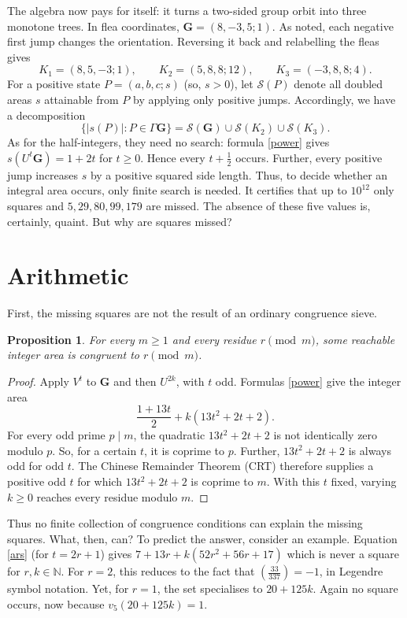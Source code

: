 \documentclass[12pt]{article}
\newtheorem{proposition}[theorem]{Proposition}
\theoremstyle{definition}
\theoremstyle{remark}
\newcommand{\mG}{\mathbf G}
\newcommand{\symb}[2]{\left(\frac{#1}{#2}\right)}
\begin{document}
The algebra now pays for itself: it turns a two-sided group orbit into three
monotone trees. In flea coordinates, $\mG=(8,-3,5;1)$. As noted, each negative first jump changes the orientation. Reversing it back and relabelling the fleas gives
\begin{equation*}
	K_1=(8,5,-3;1),\qquad K_2=(5,8,8;12),\qquad
	K_3=(-3,8,8;4).
\end{equation*}
For a positive state $P=(a,b,c;s)$ (so, $s>0$), let
$\mathscr S(P)$ denote all doubled areas $s$ attainable from $P$ by applying only positive jumps. Accordingly, we have a decomposition
\begin{equation*}
	\{|s(P)|:P\in\Gamma\mG\}
	=\mathscr S(\mG)\cup\mathscr S(K_2)\cup\mathscr S(K_3).
\end{equation*}
As for the half-integers, they need no search: formula \eqref{power} gives
$s(U^t\mG)=1+2t$ for $t\ge0$. Hence every $t+\tfrac12$ occurs. Further, 
every positive jump increases $s$ by a positive squared side length. Thus,
to decide whether an integral area occurs, only finite search is needed. It
certifies that up to $10^{12}$ only squares and $5,29,80,99,179$ are missed. The absence of these five values is, certainly, quaint. But why are squares missed?

\section{Arithmetic}
First, the missing squares are not the result of an ordinary congruence sieve.
\begin{proposition}\label{prop:all-residues}
For every $m\ge1$ and every residue $r\pmod m$, some reachable integer area
is congruent to $r\pmod m$.
\end{proposition}
\begin{proof}
Apply $V^t$ to $\mG$ and then $U^{2k}$, with $t$ odd.
Formulas \eqref{power} give the integer area
\begin{equation}
\frac{1+13t}{2}+k(13t^2+2t+2).
\label{ars}
\end{equation}
For every odd prime $p\mid m$, the quadratic $13t^2+2t+2$ is not identically
zero modulo $p$. So, for a certain $t$, it is coprime to $p$. Further, $13t^2+2t+2$ is always odd for odd $t$. The Chinese Remainder Theorem (CRT) therefore supplies a
positive odd $t$ for which $13t^2+2t+2$ is coprime to $m$. With this $t$
fixed, varying $k\ge0$ reaches every residue modulo $m$.
\end{proof}

Thus no finite collection of congruence conditions can explain the missing
squares. What, then, can? To predict the answer, consider an example. Equation \eqref{ars} (for $t=2r+1$) gives $7+13r+k(52r^2+56r+17)$ which is never a square for $r,k\in\mathbb{N}$. For $r=2$, this reduces to the fact that $\symb{33}{337}=-1$, in Legendre symbol notation. Yet, for $r=1$, the set specialises to $20+125k$. Again no square occurs, now because $v_{5}(20+125k)=1$.
\end{document}
